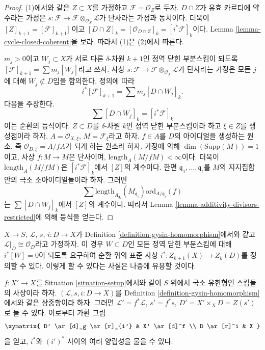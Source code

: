 \begin{proof}
(1)에서와 같은 $Z \subset X$를 가정하고
$\mathcal{F} = \mathcal{O}_Z$로 두자. $D \cap Z$가 유효 카르티에
약수라는 가정은
$s : \mathcal{F} \to \mathcal{F} \otimes_{\mathcal{O}_X} \mathcal{L}$가
단사라는 가정과 동치이다. 더욱이 $[Z]_{k + 1} = [\mathcal{F}]_{k + 1}]$
이고 $[D \cap Z]_k = [\mathcal{O}_{D \cap Z}]_k = [i^*\mathcal{F}]_k$이다.
Lemma \ref{lemma-cycle-closed-coherent}을 보라. 따라서 (1)은 (2)에서
따른다.

\medskip\noindent
$m_j > 0$이고 $W_j \subset X$가 서로 다른 $\delta$-차원 $k + 1$인 정역
닫힌 부분스킴이 되도록
$[\mathcal{F}]_{k + 1} = \sum m_j[W_j]$라고 쓰자. 사상
$s : \mathcal{F} \to \mathcal{F} \otimes_{\mathcal{O}_X} \mathcal{L}$가
단사라는 가정은 모든 $j$에 대해 $W_j \not \subset D$임을 함의한다.
정의에 따라
$$
i^*[\mathcal{F}]_{k + 1} = \sum m_j [D \cap W_j]_k.
$$
다음을 주장한다.
$$
\sum [D \cap W_j]_k = [i^*\mathcal{F}]_k
$$
이는 순환의 등식이다. $Z \subset D$를 $\delta$-차원 $k$인 정역 닫힌
부분스킴이라 하고 $\xi \in Z$를 생성점이라 하자.
$A = \mathcal{O}_{X, \xi}$, $M = \mathcal{F}_\xi$라고 하자. $f \in A$를
$D$의 아이디얼을 생성하는 원소, 즉
$\mathcal{O}_{D, \xi} = A/fA$가 되게 하는 원소라 하자. 가정에 의해
$\dim(\text{Supp}(M)) = 1$이고, 사상 $f : M \to M$은 단사이며,
$\text{length}_A(M/fM) < \infty$이다. 더욱이
$\text{length}_A(M/fM)$은 $[i^*\mathcal{F}]_k$에서 $[Z]$의 계수이다.
한편 $\mathfrak q_1, \ldots, \mathfrak q_t$를 $M$의 지지집합 안의 극소
소아이디얼들이라 하자. 그러면
$$
\sum
\text{length}_{A_{\mathfrak q_i}}(M_{\mathfrak q_i})
\text{ord}_{A/\mathfrak q_i}(f)
$$
는 $\sum [D \cap W_j]_k$에서 $[Z]$의 계수이다. 따라서 Lemma
\ref{lemma-additivity-divisors-restricted}에 의해 등식을 얻는다.
\end{proof}

\begin{remark}
\label{remark-gysin-on-cycles}
$X \to S$, $\mathcal{L}$, $s$, $i : D \to X$가 Definition
\ref{definition-gysin-homomorphism}에서와 같고
$\mathcal{L}|_D \cong \mathcal{O}_D$라고 가정하자. 이 경우
$W \subset D$인 모든 정역 닫힌 부분스킴에 대해 $i^*[W] = 0$이 되도록
요구하여 순환 위의 표준 사상 $i^* : Z_{k + 1}(X) \to Z_k(D)$를 정의할
수 있다. 이렇게 할 수 있다는 사실은 나중에 유용할 것이다.
\end{remark}

\begin{remark}
\label{remark-pullback-pairs}
$f : X' \to X$를 Situation \ref{situation-setup}에서와 같이 $S$ 위에서
국소 유한형인 스킴들의 사상이라 하자.
$(\mathcal{L}, s, i : D \to X)$를 Definition
\ref{definition-gysin-homomorphism}에서와 같은 삼중항이라 하자. 그러면
$\mathcal{L}' = f^*\mathcal{L}$, $s' = f^*s$,
$D' = X' \times_X D = Z(s')$로 둘 수 있다. 이로부터 가환 그림
$$
\xymatrix{
D' \ar[d]_g \ar[r]_{i'} & X' \ar[d]^f \\
D \ar[r]^i & X
}
$$
을 얻고, $i^*$와 $(i')^*$ 사이의 여러 양립성을 물을 수 있다.
\end{remark}

